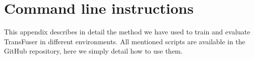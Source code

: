 \chapter{Command line instructions}

This appendix describes in detail the method we have used to train and evaluate TransFuser in different environments.
All mentioned scripts are available in the GitHub repository,
here we simply detail how to use them.




